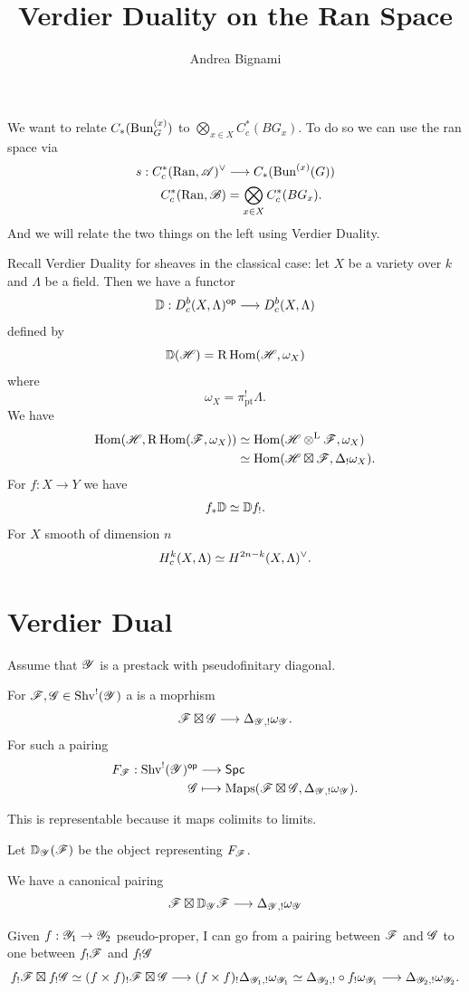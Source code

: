 \documentclass[oneside]{amsart}
\title{Verdier Duality on the Ran Space}
\author{Andrea Bignami}
\begin{document}
\maketitle

We want to relate $C_*(\operatorname{Bun}^{(x)}_G)$ to $\bigotimes_{x\in X}C^{*}_c(BG_x)$. To do so we can use the ran space via
\begin{align*}
	s:C^{*}_c(\Ran,\CA)^{\vee} &\to C_*(\Bun^{(x)}(G)) \\
	C_c^{*}(\Ran, \CB) &= \bigotimes_{x\in X}C^{*}_c(BG_x).
\end{align*}
And we will relate the two things on the left using Verdier Duality.

Recall Verdier Duality for sheaves in the classical case: let $X$ be a variety over $k$ and $\Lambda$ be a field. Then we have a functor
\[
\VD:D^{b}_c(X,\Lambda)\op \to D_c^{b}(X,\Lambda)
\] 
defined by
\[
\mathbb{D}(\mathscr{H}) = \mathrm{R}\operatorname{Hom}(\mathscr{H},\omega_X)
\] 
where
\[
\omega_X = \pi_{\text{pt}}^{!}\Lambda.
\]
We have
\begin{align*}
	\operatorname{Hom}(\mathscr{H},\mathrm{R}\operatorname{Hom}(\mathscr{F},\omega_X)) &\simeq \operatorname{Hom}(\mathscr{H}\otimes^{\mathrm{L}}\mathscr{F},\omega_X) \\
					&\simeq \operatorname{Hom}(\mathscr{H}\boxtimes\mathscr{F},\Delta_!\omega_X).
\end{align*}
For $f:X\to Y$ we have 
\[
f_*\mathbb{D} \simeq \mathbb{D} f_!.
\] 
For $X$ smooth of dimension $n$ 
\[
H_c^{k}(X,\Lambda) \simeq H^{2n-k}(X,\Lambda)^{\vee}.
\]

\section{Verdier Dual}
Assume that $\mathscr{Y}$ is a prestack with pseudofinitary diagonal.

\begin{definition}
	For $\mathscr{F},\mathscr{G}\in \operatorname{Shv}^{!}(\mathscr{Y})$ a  is a moprhism
	\[
		\CF\boxtimes \CG \to \Delta_{\CY,!}\omega_\CY.
	\] 
	For such a pairing
	\begin{align*}
		F_{\mathscr{F}}: \operatorname{Shv}^{!}(\mathscr{Y})^\mathsf{op} &\longrightarrow \mathsf{Spc} \\
		\mathscr{G} &\longmapsto \operatorname{Maps}(\mathscr{F}\boxtimes \mathscr{G},\Delta_{\mathscr{Y},!}\omega_{\mathscr{Y}}).
	\end{align*}
\end{definition}
This is representable because it maps colimits to limits.

\begin{definition}
	Let $\mathbb{D}_{\mathscr{Y}}(\mathscr{F})$ be the object representing $F_{\mathscr{F}}$.
\end{definition}
\begin{remark}
	We have a canonical pairing
	\[
	\CF \boxtimes \VD_\CY\CF \to \Delta_{\CY,!}\omega_\CY
	\] 
\end{remark}
Given $f:\CY_1\to \CY_2$ pseudo-proper, I can go from a pairing between $\mathscr{F}$ and $\mathscr{G}$ to one between $f_!\mathscr{F}$ and $f_!\mathscr{G}$
\[
f_!\CF \boxtimes f_!\CG \isoto (f\times f)_!\CF\boxtimes\CG \to (f\times f)_!\Delta_{\CY_1,!}\omega_{\CY_1} \isoto \Delta_{\CY_2,!}\circ f_! \omega_{\CY_1} \to \Delta_{\CY_2,!}\omega_{\CY_2}.
\] 
\end{document}
